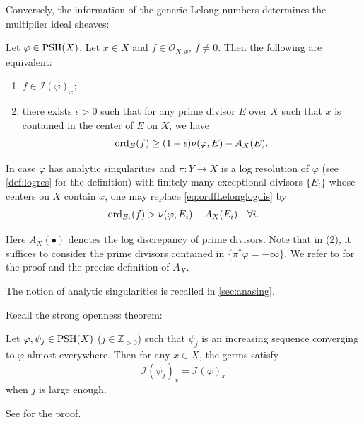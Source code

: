 Conversely, the information of the generic Lelong numbers determines the multiplier ideal sheaves:
\begin{theorem}\label{thm:valuativemulti}
    Let $\varphi\in \mathrm{PSH}(X)$.
    Let $x\in X$ and $f\in \mathcal{O}_{X,x}$, $f\neq 0$. Then the following are equivalent:
    \begin{enumerate}
        \item\label{itm:thm:valuativemulti:1} $f\in \mathcal{I}(\varphi)_x$;
        \item\label{itm:thm:valuativemulti:2} there exists $\epsilon>0$ such that for any prime divisor $E$ over $X$ such that $x$ is contained in the center of $E$ on $X$, we have
            \begin{equation}\label{eq:ordfLelonglogdis}
                \operatorname{ord}_E(f)\geq (1+\epsilon) \nu(\varphi,E)-A_X(E).
            \end{equation}
    \end{enumerate}
    In case $\varphi$ has analytic singularities and $\pi\colon Y\rightarrow X$ is a log resolution of $\varphi$ (see \cref{def:logres} for the definition) with finitely many exceptional divisors $\{E_i\}$ whose centers on $X$ contain $x$, one may replace \eqref{eq:ordfLelonglogdis} by
    \begin{equation}\label{eq:ordfLelonglogdis2}
    \operatorname{ord}_{E_i}(f)> \nu(\varphi,E_i)-A_X(E_i)\quad \forall i.
    \end{equation}
\end{theorem}
Here $A_X(\bullet)$ denotes the log discrepancy of prime divisors. Note that in (2), it suffices to consider the prime divisors contained in $\{\pi^*\varphi=-\infty\}$.
We refer to \cite[Corollary~10.18, Proposition~10.12]{Bou17} for the proof and the precise definition of $A_X$.

The notion of analytic singularities is recalled in \cref{sec:anasing}.

Recall the strong openness theorem:
\begin{theorem}\label{thm:strongopen}
    Let $\varphi,\psi_j\in \mathrm{PSH}(X)$ ($j\in \mathbb{Z}_{>0}$) such that $\psi_j$ is an increasing sequence converging to $\varphi$ almost everywhere. Then for any $x\in X$, the germs satisfy
    \[
        \mathcal{I}\left(\psi_j\right)_x=\mathcal{I}(\varphi)_x
    \]
    when $j$ is large enough.
\end{theorem}
See \cite{GZ15, Hiep14} for the proof.


